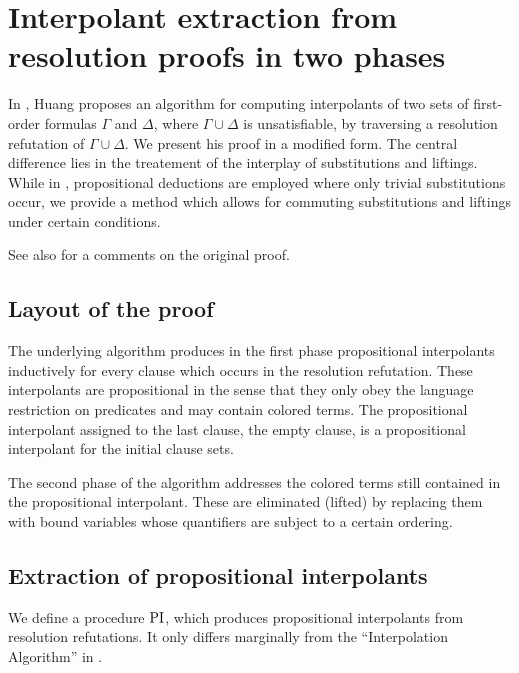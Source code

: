 \chapter{Interpolant extraction from resolution proofs in two phases}

In \cite{Huang95}, Huang proposes an algorithm for computing interpolants of two sets of first-order formulas $\Gamma$ and $\Delta$, where $\Gamma\cup\Delta$ is unsatisfiable, by traversing a resolution refutation of $\Gamma \cup \Delta$.
We present his proof in a modified form.
The central difference lies in the treatement of the interplay of substitutions and liftings. While in \cite{Huang95}, propositional deductions are employed where only trivial substitutions occur, we provide a method which allows for commuting substitutions and liftings under certain conditions.

See also \mytodo{} for a comments on the original proof.

\section{Layout of the proof}

The underlying algorithm produces in the first phase propositional interpolants inductively for every clause which occurs in the resolution refutation.
These interpolants are propositional in the sense that they only obey the language restriction on predicates and may contain colored terms.
The propositional interpolant assigned to the last clause, the empty clause, is a propositional interpolant for the initial clause sets.

The second phase of the algorithm addresses the colored terms still contained in the propositional interpolant.
These are eliminated (lifted) by replacing them with bound variables whose quantifiers are subject to a certain ordering.



\section{Extraction of propositional interpolants}

We define a procedure $\operatorname{PI}$, which produces propositional interpolants from resolution refutations. It only differs marginally from the ``Interpolation Algorithm'' in \cite{Huang95}.

